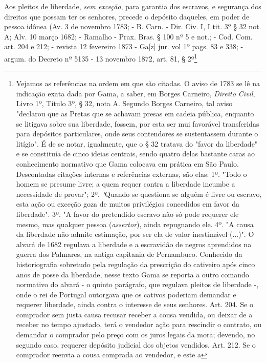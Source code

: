Aos pleitos de liberdade, \emph{sem exceção}, para garantia dos
escravos, e segurança dos direitos que possam ter os senhores, precede o
depósito daqueles, em poder de pessoa idônea (Av. 3 de novembro 1783; -
B. Carn. - Dir. Civ. I, I tit. 3º § 32 not. A; Alv. 10 março 1682; -
Ramalho - Prax. Bras. § 100 nº 5 e not.; - Cod. Com. art. 204 e 212; -
revista 12 fevereiro 1873 - Ga{[}z{]} jur. vol 1º pags. 83 e 338; -
argum. do Decreto nº 5135 - 13 novembro 1872, art. 81, § 2º\footnote{
  Vejamos as referências na ordem em que são citadas. O aviso de 1783 se
  lê na indicação exata dada por Gama, a saber, em Borges Carneiro,
  \emph{Direito Civil}, Livro 1º, Título 3º, § 32, nota A. Segundo
  Borges Carneiro, tal aviso "declarou que as Pretas que se achavam
  presas em cadeia pública, enquanto se litigava sobre sua liberdade,
  fossem, por esta ser mui favorável transferidas para depósitos
  particulares, onde seus contendores se sustentassem durante o
  litígio". É de se notar, igualmente, que o § 32 tratava do "favor da
  liberdade" e se constituía de cinco ideias centrais, sendo quatro
  delas bastante caras ao conhecimento normativo que Gama colocava em
  prática em São Paulo. Descontadas citações internas e referências
  externas, são elas: 1º. "Todo o homem se presume livre; a quem requer
  contra a liberdade incumbe a necessidade de provar"; 2º.
  \emph{"}Quando se questiona se alguém é livre ou escravo, esta ação ou
  exceção goza de muitos privilégios concedidos em favor da liberdade".
  3º. "A favor do pretendido escravo não só pode requerer ele mesmo, mas
  qualquer pessoa (\emph{assertor}), ainda repugnando ele. 4º. "A causa
  da liberdade não admite estimação, por ser ela de valor inestimável
  (...)". O alvará de 1682 regulava a liberdade e a escravidão de negros
  aprendidos na guerra dos Palmares, na antiga capitania de Pernambuco.
  Conhecido da historiografia sobretudo pela regulação da prescrição do
  cativeiro após cinco anos de posse da liberdade, nesse texto Gama se
  reporta a outro comando normativo do alvará - o quinto parágrafo, que
  regulava pleitos de liberdade -, onde o rei de Portugal outorgava que
  os cativos poderiam demandar e requerer liberdade, ainda contra o
  interesse de seus senhores. Art. 204. Se o comprador sem justa causa
  recusar receber a cousa vendida, ou deixar de a receber no tempo
  ajustado, terá o vendedor ação para rescindir o contrato, ou demandar
  o comprador pelo preço com os juros legais da mora; devendo, no
  segundo caso, requerer depósito judicial dos objetos vendidos. Art.
  212. Se o comprador reenvia a cousa comprada ao vendedor, e este a
}
